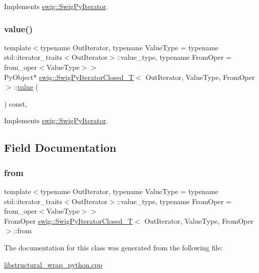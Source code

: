 Implements \hyperlink{structswig_1_1_swig_py_iterator_a8881170ecd7d9e674ef37eb16b2c9a7a}{swig\+::\+Swig\+Py\+Iterator}.

\mbox{\label{classswig_1_1_swig_py_iterator_closed___t_a4baeeb91419a21260b89205f325e0566}} 
\subsubsection{\texorpdfstring{value()}{value()}}
{\footnotesize\ttfamily template$<$typename Out\+Iterator, typename Value\+Type = typename std\+::iterator\+\_\+traits$<$\+Out\+Iterator$>$\+::value\+\_\+type, typename From\+Oper = from\+\_\+oper$<$\+Value\+Type$>$$>$ \\
Py\+Object$\ast$ \hyperlink{classswig_1_1_swig_py_iterator_closed___t}{swig\+::\+Swig\+Py\+Iterator\+Closed\+\_\+T}$<$ Out\+Iterator, Value\+Type, From\+Oper $>$\+::\hyperlink{lp__lib_8h_a606ba870f46e132d61b5e2371014a998}{value} (\begin{DoxyParamCaption}{ }\end{DoxyParamCaption}) const\hspace{0.3cm}{\ttfamily [inline]}, {\ttfamily [virtual]}}



Implements \hyperlink{structswig_1_1_swig_py_iterator_a7ba184c8ea37f53dbd75b6678a23f20c}{swig\+::\+Swig\+Py\+Iterator}.



\subsection{Field Documentation}
\mbox{\label{classswig_1_1_swig_py_iterator_closed___t_a8a87b95d1e7e7d0784866dc71189575d}} 
\subsubsection{\texorpdfstring{from}{from}}
{\footnotesize\ttfamily template$<$typename Out\+Iterator, typename Value\+Type = typename std\+::iterator\+\_\+traits$<$\+Out\+Iterator$>$\+::value\+\_\+type, typename From\+Oper = from\+\_\+oper$<$\+Value\+Type$>$$>$ \\
From\+Oper \hyperlink{classswig_1_1_swig_py_iterator_closed___t}{swig\+::\+Swig\+Py\+Iterator\+Closed\+\_\+T}$<$ Out\+Iterator, Value\+Type, From\+Oper $>$\+::from}



The documentation for this class was generated from the following file\+:\begin{DoxyCompactItemize}
\item 
\hyperlink{libstructural__wrap__python_8cpp}{libstructural\+\_\+wrap\+\_\+python.\+cpp}\end{DoxyCompactItemize}

